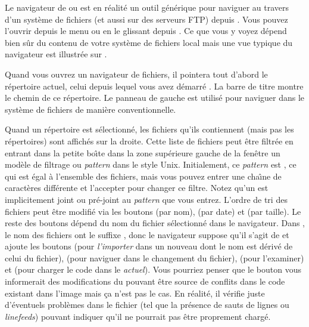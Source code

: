 \documentclass[a4paper,10pt,twoside]{book}
\begin{document}
Le navigateur de  ou  est
en r\'ealit\'e un outil g\'en\'erique pour naviguer au travers d'un syst\`eme de fichiers
(et aussi sur des serveurs FTP) depuis \pharo.
Vous pouvez l'ouvrir depuis le menu  ou
en le glissant depuis \toolsflapind.
Ce que vous y voyez d\'epend bien s\^ur du contenu de votre syst\`eme de fichiers local
mais une vue typique du navigateur est illustr\'ee sur 
.

Quand vous ouvrez un navigateur de fichiers, il pointera tout d'abord le r\'epertoire
actuel, \ie celui depuis lequel vous avez d\'emarr\'e \pharo. La barre de titre
montre le chemin de ce r\'epertoire.
Le panneau de gauche est utilis\'e pour naviguer dans le syst\`eme de fichiers de mani\`ere
conventionnelle.

Quand un r\'epertoire est s\'electionn\'e, les fichiers qu'ils contiennent (mais pas les r\'epertoires) sont affich\'es sur la droite.
Cette liste de fichiers peut \^etre filtr\'ee en entrant dans la petite bo\^{\i}te
dans la zone sup\'erieure gauche de la fen\^etre un mod\`ele de filtrage ou 
\emph{pattern} dans le style Unix.
Initialement, ce \emph{pattern} est \ct{*}, ce qui est \'egal \`a l'ensemble des fichiers, mais vous pouvez entrer une cha\^{\i}ne de caract\`eres diff\'erente et l'accepter pour changer ce filtre. 
Notez qu'un \ct{*} est implicitement joint ou pr\'e-joint au \emph{pattern}
que vous entrez.
L'ordre de tri des fichiers peut \^etre modifi\'e via les boutons  (par nom),  (par date) et  (par taille).
Le reste des boutons d\'epend du nom du fichier s\'electionn\'e dans le navigateur.
Dans , le nom des fichiers ont le suffixe , donc le navigateur
suppose qu'il s'agit de \changeset et ajoute les boutons  (pour
\textit{l'importer} dans un nouveau \changeset dont le nom est d\'eriv\'e
de celui du fichier),  (pour naviguer dans le changement du fichier),
 (pour l'examiner) et  (pour charger
le code dans le \changeset \emph{actuel}).
Vous pourriez penser que le bouton  vous informerait 
des modifications du \changeset pouvant \^etre source de conflits dans le code existant
dans l'image mais \c{c}a n'est pas le cas.
En r\'ealit\'e, il v\'erifie juste d'\'eventuels probl\`emes dans le fichier (tel que
la pr\'esence de sauts de lignes ou \textit{linefeeds})
pouvant indiquer qu'il ne pourrait pas \^etre proprement charg\'e.
\end{document}
